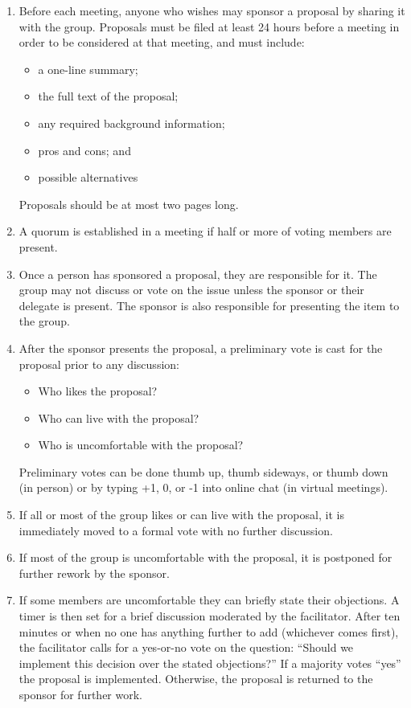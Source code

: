 \begin{enumerate}

\item
  Before each meeting,
  anyone who wishes may sponsor a proposal by sharing it with the group.
  Proposals must be filed at least 24 hours before a meeting in order to be considered at that meeting,
  and must include:
  \begin{itemize}
  \item a one-line summary;
  \item the full text of the proposal;
  \item any required background information;
  \item pros and cons; and
  \item possible alternatives
  \end{itemize}
  Proposals should be at most two pages long.

\item
  A quorum is established in a meeting if half or more of voting members are present.

\item
  Once a person has sponsored a proposal,
  they are responsible for it.
  The group may not discuss or vote on the issue unless the sponsor or their delegate is present.
  The sponsor is also responsible for presenting the item to the group.

\item
  After the sponsor presents the proposal,
  a preliminary vote is cast for the proposal prior to any discussion:
  \begin{itemize}
  \item Who likes the proposal?
  \item Who can live with the proposal?
  \item Who is uncomfortable with the proposal?
  \end{itemize}
  Preliminary votes can be done thumb up, thumb sideways, or thumb down (in person)
  or by typing +1, 0, or -1 into online chat (in virtual meetings).

\item
  If all or most of the group likes or can live with the proposal,
  it is immediately moved to a formal vote with no further discussion.

\item
  If most of the group is uncomfortable with the proposal,
  it is postponed for further rework by the sponsor.

\item
  If some members are uncomfortable they can briefly state their objections.
  A timer is then set for a brief discussion moderated by the facilitator.
  After ten minutes or when no one has anything further to add (whichever comes first),
  the facilitator calls for a yes-or-no vote on the question:
  ``Should we implement this decision over the stated objections?''
  If a majority votes ``yes'' the proposal is implemented.
  Otherwise, the proposal is returned to the sponsor for further work.

\end{enumerate}

